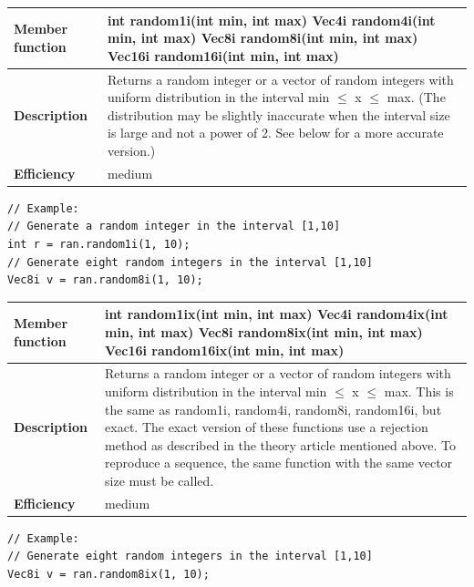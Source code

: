 \documentclass[11pt,a4paper,oneside,openright]{report}
\newcommand{\vspacesmall}{\vspace{3mm}}
\begin{document}
\begin{tabular}{|p{30mm}|p{100mm}|}
\hline
\bfseries Member function & int random1i(int min, int max) \newline
Vec4i random4i(int min, int max) \newline
Vec8i random8i(int min, int max) \newline
Vec16i random16i(int min, int max) \\ \hline
\bfseries Description & Returns a random integer or a vector of random integers
with uniform distribution in the interval min $\leq$ x $\leq$ max. \newline
(The distribution may be slightly inaccurate when the interval size is large and not a power of 2. See below for a more accurate version.) \\ \hline
\bfseries Efficiency & medium \\ \hline
\end{tabular}
\begin{lstlisting}[frame=none]
// Example:
// Generate a random integer in the interval [1,10]
int r = ran.random1i(1, 10);
// Generate eight random integers in the interval [1,10]
Vec8i v = ran.random8i(1, 10);
\end{lstlisting}
\vspacesmall


\begin{tabular}{|p{30mm}|p{100mm}|}
\hline
\bfseries Member function & int random1ix(int min, int max) \newline
Vec4i random4ix(int min, int max) \newline
Vec8i random8ix(int min, int max) \newline
Vec16i random16ix(int min, int max) \\ \hline
\bfseries Description & Returns a random integer or a vector of random integers with uniform distribution in the interval min $\leq$ x $\leq$ max. \newline
This is the same as random1i, random4i, random8i, random16i, but exact. \newline
The exact version of these functions use a rejection method as described in the theory article mentioned above. To reproduce a sequence, the same function with the same vector size must be called. \\ \hline
\bfseries Efficiency & medium \\ \hline
\end{tabular}
\begin{lstlisting}[frame=none]
// Example:
// Generate eight random integers in the interval [1,10]
Vec8i v = ran.random8ix(1, 10);
\end{lstlisting}
\vspacesmall
\end{document}
